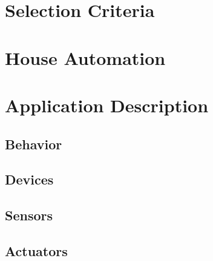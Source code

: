 
\section{Selection Criteria}

\section{House Automation}

\section{Application Description}
\subsection{Behavior}
\subsection{Devices}
\subsection{Sensors}
\subsection{Actuators}
